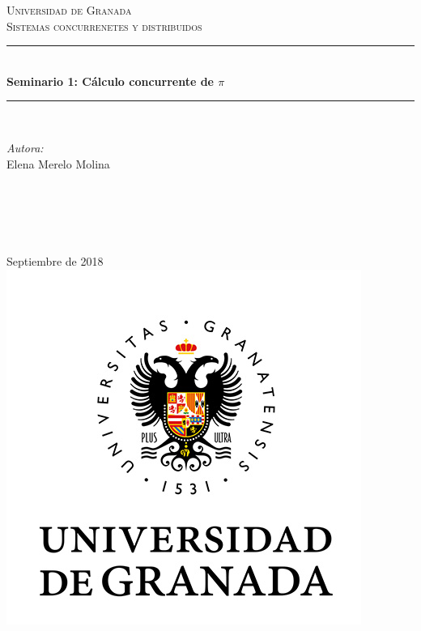 \documentclass[12pt]{article}
\begin{document}
\begin{titlepage}
\newcommand{\HRule}{\rule{\linewidth}{0.5mm}}
\center
\textsc{\LARGE Universidad de Granada}\\[1.5cm] %
\textsc{\Large Sistemas concurrenetes y distribuidos}\\[0.5cm] %
\HRule \\[0.4cm]
{ \huge \bfseries Seminario 1: Cálculo concurrente de $\pi$}\\[0.4cm] %
\HRule \\[1.5cm]
\begin{minipage}{0.4\textwidth}
\begin{flushleft} \large
\emph{Autora:}\\
Elena Merelo Molina \textsc{} %
\end{flushleft}
\end{minipage}
~
\begin{minipage}{0.4\textwidth}
\begin{flushright} \large
\emph{} \\
\textsc{} %
\end{flushright}
\end{minipage}\\[2cm]
{\large Septiembre de 2018}\\[2cm] %
\includegraphics[scale=0.5]{../images/logo.jpg}
\vfill %
\end{titlepage}
\end{document}
